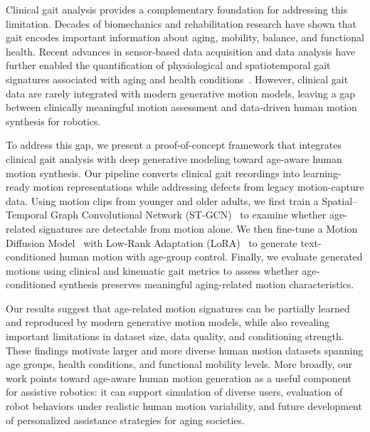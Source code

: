 Clinical gait analysis provides a complementary foundation for addressing this limitation.
Decades of biomechanics and rehabilitation research have shown that gait encodes important information about aging, mobility, balance, and functional health.
Recent advances in sensor-based data acquisition and data analysis have further enabled the quantification of physiological and spatiotemporal gait signatures associated with aging and health conditions~\cite{diaz2025evaluating, galasso2024development}.
However, clinical gait data are rarely integrated with modern generative motion models, leaving a gap between clinically meaningful motion assessment and data-driven human motion synthesis for robotics.




To address this gap, we present a proof-of-concept framework that integrates clinical gait analysis with deep generative modeling toward age-aware human motion synthesis.
Our pipeline converts clinical gait recordings into learning-ready motion representations while addressing defects from legacy motion-capture data.
Using motion clips from younger and older adults, we first train a Spatial--Temporal Graph Convolutional Network (ST-GCN)~\cite{yan2018stgcn} to examine whether age-related signatures are detectable from motion alone.
We then fine-tune a Motion Diffusion Model~\cite{tevet2023human} with Low-Rank Adaptation (LoRA)~\cite{hu2022lora} to generate text-conditioned human motion with age-group control.
Finally, we evaluate generated motions using clinical and kinematic gait metrics to assess whether age-conditioned synthesis preserves meaningful aging-related motion characteristics.



Our results suggest that age-related motion signatures can be partially learned and reproduced by modern generative motion models, while also revealing important limitations in dataset size, data quality, and conditioning strength.
These findings motivate larger and more diverse human motion datasets spanning age groups, health conditions, and functional mobility levels.
More broadly, our work points toward age-aware human motion generation as a useful component for assistive robotics: it can support simulation of diverse users, evaluation of robot behaviors under realistic human motion variability, and future development of personalized assistance strategies for aging societies.



